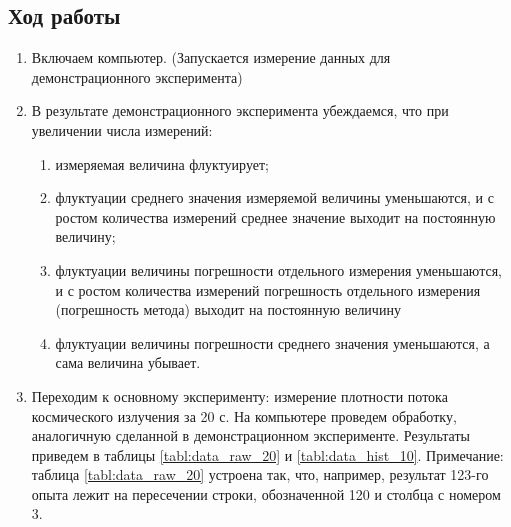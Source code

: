 \documentclass[a4paper, 12pt]{article}
\begin{document}
\subsection*{Ход работы}
\begin{enumerate}

    \item Включаем компьютер. (Запускается измерение данных для демонстрационного эксперимента)
    \item В результате демонстрационного эксперимента убеждаемся, что при увеличении числа измерений:

        \begin{enumerate}
            \item измеряемая величина флуктуирует;
            \item флуктуации среднего значения измеряемой величины уменьшаются, и с ростом количества измерений среднее значение выходит на постоянную величину;
            \item флуктуации величины погрешности отдельного измерения уменьшаются, и с ростом количества измерений погрешность отдельного измерения (погрешность метода) выходит на постоянную величину
            \item флуктуации величины погрешности среднего значения уменьшаются, а сама величина убывает.
        \end{enumerate}

    \item Переходим к основному эксперименту: измерение плотности потока космического излучения за 20 с. На компьютере проведем обработку, аналогичную сделанной в демонстрационном эксперименте. Результаты приведем в таблицы \ref{tabl:data_raw_20} и \ref{tabl:data_hist_10}. Примечание: таблица \ref{tabl:data_raw_20} устроена так, что, например, результат 123-го опыта лежит на пересечении строки, обозначенной 120 и столбца с номером 3.


\end{enumerate}
\end{document}
